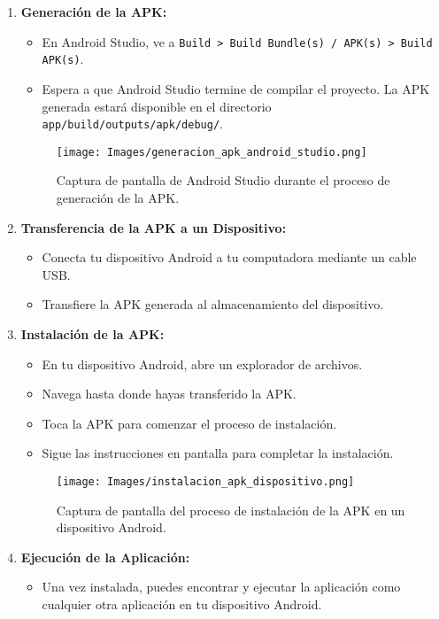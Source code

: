 \documentclass{article}
\begin{document}
    \begin{enumerate}
        \item \textbf{Generación de la APK:}
            \begin{itemize}
                \item En Android Studio, ve a \texttt{Build > Build Bundle(s) / APK(s) > Build APK(s)}.
                \item Espera a que Android Studio termine de compilar el proyecto. La APK generada estará disponible en el directorio \texttt{app/build/outputs/apk/debug/}.
            \end{itemize}
            
            \begin{figure}[h]
                \centering
                \texttt{[image: Images/generacion\_apk\_android\_studio.png]}
                \caption{Captura de pantalla de Android Studio durante el proceso de generación de la APK.}
                \label{fig:generacion_apk}
            \end{figure}
        
        \item \textbf{Transferencia de la APK a un Dispositivo:}
            \begin{itemize}
                \item Conecta tu dispositivo Android a tu computadora mediante un cable USB.
                \item Transfiere la APK generada al almacenamiento del dispositivo.
            \end{itemize}
        
        \item \textbf{Instalación de la APK:}
            \begin{itemize}
                \item En tu dispositivo Android, abre un explorador de archivos.
                \item Navega hasta donde hayas transferido la APK.
                \item Toca la APK para comenzar el proceso de instalación.
                \item Sigue las instrucciones en pantalla para completar la instalación.
            \end{itemize}

        \begin{figure}[h]
                \centering
                \texttt{[image: Images/instalacion\_apk\_dispositivo.png]}
                \caption{Captura de pantalla del proceso de instalación de la APK en un dispositivo Android.}
                \label{fig:instalacion_apk}
            \end{figure}
            
        \item \textbf{Ejecución de la Aplicación:}
            \begin{itemize}
                \item Una vez instalada, puedes encontrar y ejecutar la aplicación como cualquier otra aplicación en tu dispositivo Android.
            \end{itemize}
    \end{enumerate}
\end{document}

